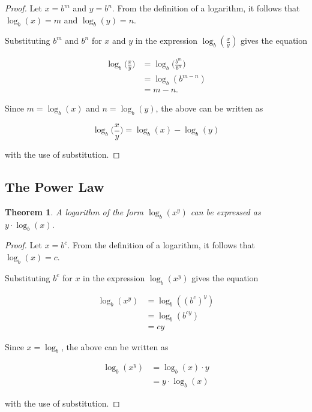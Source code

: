 \documentclass[parskip]{scrartcl}
\newtheorem{theorem}{Theorem}
\begin{document}
\begin{proof}
  Let \(x = b^m\) and \(y = b^n\). From the definition of a logarithm, it
  follows that \(\log_b(x) = m\) and \(\log_b(y) = n\).

  Substituting \(b^m\) and \(b^n\) for \(x\) and \(y\) in the expression
  \(\log_b(\frac{x}{y})\) gives the equation

  \begin{equation*}
    \begin{split}
      \log_b\big(\frac{x}{y}\big) &= \log_b\big(\frac{b^m}{b^n}\big) \\
      &= \log_b(b^{m - n}) \\
      &= m - n.
    \end{split}
  \end{equation*}

  Since \(m = \log_b(x)\) and \(n = \log_b(y)\), the above can be written as

  \begin{equation*}
    \log_b\big(\frac{x}{y}\big) = \log_b(x) - \log_b(y)
  \end{equation*}

  with the use of substitution.
\end{proof}

\subsection{The Power Law}

\begin{theorem}
  A logarithm of the form \(\log_b(x^y)\) can be expressed as \(y ·
  \log_b(x)\).
\end{theorem}

\begin{proof}
  Let \(x = b^{c}\). From the definition of a logarithm, it follows that
  \(\log_b(x) = c\).

  Substituting \(b^c\) for \(x\) in the expression \(\log_b(x^y)\) gives the
  equation

  \begin{equation*}
    \begin{split}
      \log_b(x^y) &= \log_b({(b^c)}^y) \\
      &= \log_b(b^{cy}) \\
      &= cy
    \end{split}
  \end{equation*}

  Since \(x = \log_b\), the above can be written as

  \begin{equation*}
    \begin{split}
      \log_b(x^y) &= \log_b(x) · y \\
      &= y · \log_b(x)
    \end{split}
  \end{equation*}

  with the use of substitution.
\end{proof}
\end{document}
